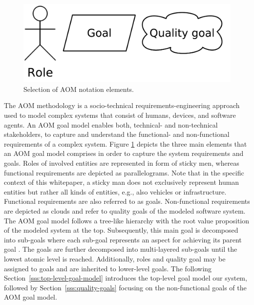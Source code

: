 \documentclass{llncs}
\begin{document}
{			\begin{figure}[H]
				\centering
				\includegraphics[scale=0.2]{Figures/20180426_AOM-notation.pdf}
				\caption{Selection of AOM notation elements.}	
				\label{fig:aom-notaion-elements}
			\end{figure}				
			The AOM methodology is a socio-technical requirements-engineering approach used to model complex systems that consist of humans, devices, and software agents. An AOM goal model enables both, technical- and non-technical stakeholders, to capture and understand the functional- and non-functional requirements of a complex system. Figure \ref{fig:aom-notaion-elements} depicts the three main elements that an AOM goal model comprises in order to capture the system requirements and goals. Roles of involved entities are represented in form of sticky men, whereas functional requirements are depicted as parallelograms. Note that in the specific context of this whitepaper, a sticky man does not exclusively represent human entities but rather all kinds of entities, e.g., also vehicles or infrastructure. Functional requirements are also referred to as goals. Non-functional requirements are depicted as clouds and refer to quality goals of the modeled software system. The AOM goal model follows a tree-like hierarchy with the root value proposition of the modeled system at the top. Subsequently, this main goal is decomposed into sub-goals where each sub-goal represents an aspect for achieving its parent goal \cite{marshall2014agent}. The goals are further decomposed into multi-layered sub-goals until the lowest atomic level is reached. Additionally, roles and quality goal may be assigned to goals and are inherited to lower-level goals. The following Section~\ref{sss:top-level-goal-model} introduces the top-level goal model our system, followed by Section~\ref{sss:quality-goals} focusing on the non-functional goals of the AOM goal model.

			
					
}
\end{document}
